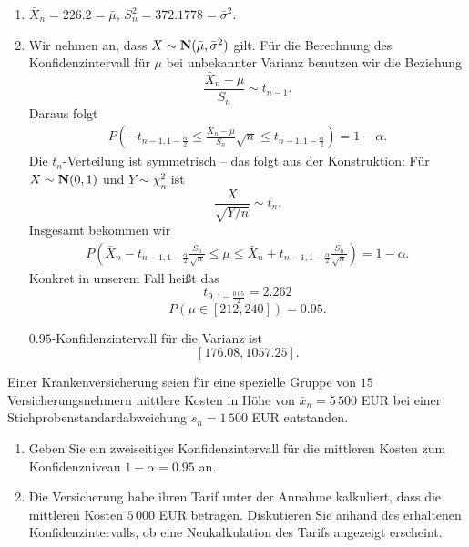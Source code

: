 \solution
\begin{enumerate}
    \item $\bar X_n = 226.2 = \bar \mu$, $S^2_n = 372.1778 = \bar \sigma^2$.
    \item Wir nehmen an, dass $X \sim \mathbf N(\bar \mu, \bar \sigma^2)$ gilt. 
        Für die Berechnung des Konfidenzintervall für $\mu$ bei unbekannter Varianz
        benutzen wir die Beziehung
        \begin{equation*}
            \frac{\bar X_n - \mu}{ S_n} \sim t_{n-1}. 
        \end{equation*}
        Daraus folgt
        \begin{align*}
            P\left( - t_{n-1, 1-\frac{\alpha}{2}} \leq 
            \frac{\bar X_n - \mu}{ S_n}\sqrt{n}
            \leq t_{n-1, 1-\frac{\alpha}{2}} \right) = 1-\alpha. 
        \end{align*}
        Die $t_{n}$-Verteilung ist symmetrisch -- das folgt aus der Konstruktion: Für 
        $X\sim \mathbf N(0,1)$ und $Y\sim \chi^{2}_{n}$ ist 
        \begin{equation*}
            \frac{X}{\sqrt{Y/n}} \sim t_{n}. 
        \end{equation*}
        Insgesamt bekommen wir
        \begin{align*}
            P\left( \bar X_n - t_{n-1, 1-\frac{\alpha}{2}} \frac{S_{n}}{\sqrt{n}} 
            \leq \mu \leq \bar X_{n} + t_{n-1, 1-\frac{\alpha}{2}} \frac{S_{n}}{\sqrt{n}}
            \right) = 1-\alpha. 
        \end{align*}
        Konkret in unserem Fall heißt das
        \begin{equation*}
            t_{9, 1-\frac{0.05}{2}} = 2.262
        \end{equation*}
        \begin{equation*}
            P\left( \mu \in \left[ 212 , 240 \right] \right) = 0.95.
        \end{equation*}

        $0.95$-Konfidenzintervall für die Varianz ist 
        \begin{equation*}
            \left[ 176.08, 1057.25 \right].
        \end{equation*}
\end{enumerate}

 Einer Krankenversicherung
seien für eine spezielle Gruppe von $15$ Versicherungsnehmern mittlere Kosten
in Höhe von $\bar x_n = 5\,500$ EUR bei einer Stichprobenstandardabweichung
$s_n = 1\, 500$ EUR entstanden.
\begin{enumerate}
    \item Geben Sie ein zweiseitiges Konfidenzintervall für die mittleren
        Kosten zum Konfidenzniveau $1-\alpha=0.95$ an. 
    \item Die Versicherung habe ihren Tarif unter der Annahme kalkuliert, dass
        die mittleren Kosten $5\, 000$ EUR betragen. Diskutieren Sie anhand des
        erhaltenen Konfidenzintervalls, ob eine Neukalkulation des Tarifs
        angezeigt erscheint. 
\end{enumerate}


